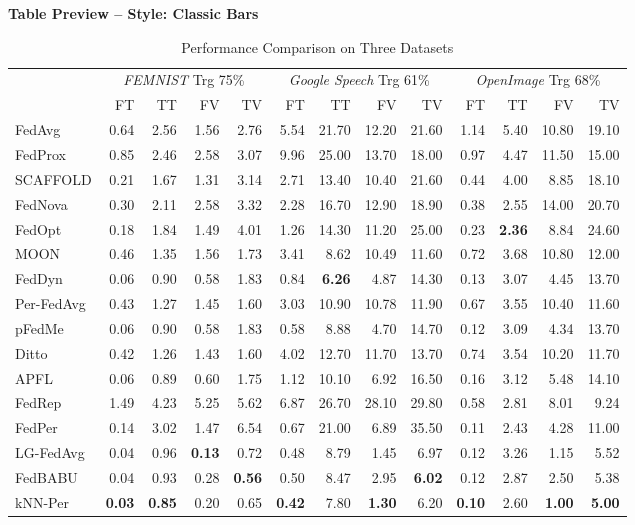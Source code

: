 \documentclass[conference]{IEEEtran}
\begin{document}
\onecolumn
\begin{center}
\Large\textbf{Table Preview -- Style: Classic Bars}
\end{center}
\vspace{1em}
\begin{table}[t]
\centering
\caption{Performance Comparison on Three Datasets}
\label{tab:main-result}
\footnotesize

\begin{tabular}{l|rrrr|rrrr|rrrr|}
\toprule
 & \multicolumn{4}{c}{\textit{FEMNIST} Trg 75\%} & \multicolumn{4}{c}{\textit{Google Speech} Trg 61\%} & \multicolumn{4}{c}{\textit{OpenImage} Trg 68\%} \\
\cmidrule(lr){2-5} \cmidrule(lr){6-9} \cmidrule(lr){10-13}
 & FT & TT & FV & TV & FT & TT & FV & TV & FT & TT & FV & TV \\
\cmidrule(lr){2-5} \cmidrule(lr){6-9} \cmidrule(lr){10-13}
FedAvg & 0.64 & 2.56 & 1.56 & 2.76 & 5.54 & 21.70 & 12.20 & 21.60 & 1.14 & 5.40 & 10.80 & 19.10 \\
FedProx & 0.85 & 2.46 & 2.58 & 3.07 & 9.96 & 25.00 & 13.70 & 18.00 & 0.97 & 4.47 & 11.50 & 15.00 \\
SCAFFOLD & 0.21 & 1.67 & 1.31 & 3.14 & 2.71 & 13.40 & 10.40 & 21.60 & 0.44 & 4.00 & 8.85 & 18.10 \\
FedNova & 0.30 & 2.11 & 2.58 & 3.32 & 2.28 & 16.70 & 12.90 & 18.90 & 0.38 & 2.55 & 14.00 & 20.70 \\
FedOpt & 0.18 & 1.84 & 1.49 & 4.01 & 1.26 & 14.30 & 11.20 & 25.00 & 0.23 & \textbf{2.36} & 8.84 & 24.60 \\
MOON & 0.46 & 1.35 & 1.56 & 1.73 & 3.41 & 8.62 & 10.49 & 11.60 & 0.72 & 3.68 & 10.80 & 12.00 \\
FedDyn & 0.06 & 0.90 & 0.58 & 1.83 & 0.84 & \textbf{6.26} & 4.87 & 14.30 & 0.13 & 3.07 & 4.45 & 13.70 \\
Per-FedAvg & 0.43 & 1.27 & 1.45 & 1.60 & 3.03 & 10.90 & 10.78 & 11.90 & 0.67 & 3.55 & 10.40 & 11.60 \\
pFedMe & 0.06 & 0.90 & 0.58 & 1.83 & 0.58 & 8.88 & 4.70 & 14.70 & 0.12 & 3.09 & 4.34 & 13.70 \\
Ditto & 0.42 & 1.26 & 1.43 & 1.60 & 4.02 & 12.70 & 11.70 & 13.70 & 0.74 & 3.54 & 10.20 & 11.70 \\
APFL & 0.06 & 0.89 & 0.60 & 1.75 & 1.12 & 10.10 & 6.92 & 16.50 & 0.16 & 3.12 & 5.48 & 14.10 \\
FedRep & 1.49 & 4.23 & 5.25 & 5.62 & 6.87 & 26.70 & 28.10 & 29.80 & 0.58 & 2.81 & 8.01 & 9.24 \\
FedPer & 0.14 & 3.02 & 1.47 & 6.54 & 0.67 & 21.00 & 6.89 & 35.50 & 0.11 & 2.43 & 4.28 & 11.00 \\
LG-FedAvg & 0.04 & 0.96 & \textbf{0.13} & 0.72 & 0.48 & 8.79 & 1.45 & 6.97 & 0.12 & 3.26 & 1.15 & 5.52 \\
FedBABU & 0.04 & 0.93 & 0.28 & \textbf{0.56} & 0.50 & 8.47 & 2.95 & \textbf{6.02} & 0.12 & 2.87 & 2.50 & 5.38 \\
kNN-Per & \textbf{0.03} & \textbf{0.85} & 0.20 & 0.65 & \textbf{0.42} & 7.80 & \textbf{1.30} & 6.20 & \textbf{0.10} & 2.60 & \textbf{1.00} & \textbf{5.00} \\
\bottomrule
\end{tabular}
\end{table}
\end{document}

